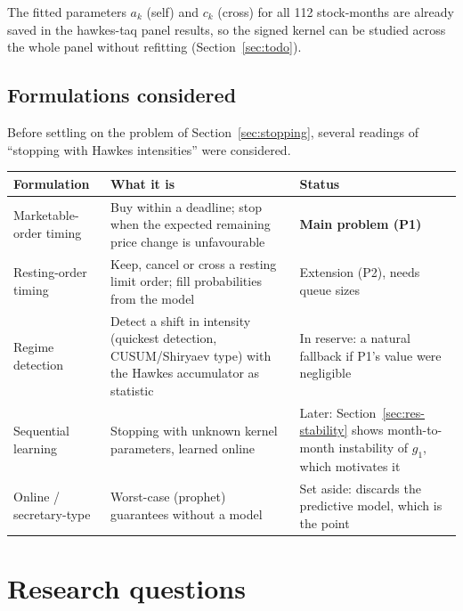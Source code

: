 \documentclass[11pt]{article}
\theoremstyle{definition}
\theoremstyle{remark}
\begin{document}
The fitted parameters $a_k$ (self) and $c_k$ (cross) for all 112 stock-months are already saved in the hawkes-taq panel results, so the signed kernel can be studied across the whole panel without refitting (Section~\ref{sec:todo}).

\subsection{Formulations considered}
\label{sec:formulations}

Before settling on the problem of Section~\ref{sec:stopping}, several readings of ``stopping with Hawkes intensities'' were considered.

\begin{center}
\begin{tabularx}{\textwidth}{@{}p{3.6cm}LL@{}}
\toprule
Formulation & What it is & Status \\
\midrule
Marketable-order timing & Buy within a deadline; stop when the expected remaining price change is unfavourable & \textbf{Main problem (P1)} \\
Resting-order timing & Keep, cancel or cross a resting limit order; fill probabilities from the model & Extension (P2), needs queue sizes \\
Regime detection & Detect a shift in intensity (quickest detection, CUSUM/Shiryaev type) with the Hawkes accumulator as statistic & In reserve: a natural fallback if P1's value were negligible \\
Sequential learning & Stopping with unknown kernel parameters, learned online & Later: Section~\ref{sec:res-stability} shows month-to-month instability of $g_1$, which motivates it \\
Online / secretary-type & Worst-case (prophet) guarantees without a model & Set aside: discards the predictive model, which is the point \\
\bottomrule
\end{tabularx}
\end{center}

\section{Research questions}
\label{sec:rq}
\end{document}
